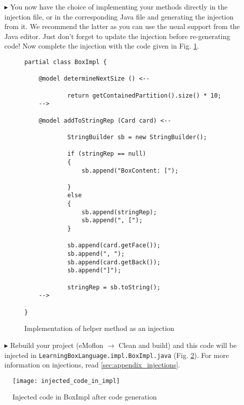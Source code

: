 \begin{enumerate}
	\clearpage
    \item[$\blacktriangleright$] You now have the choice of implementing your methods directly in the injection file, or in the corresponding Java file and
    generating the injection from it. We recommend the latter as you can use the usual support from the Java editor. Just don't forget to update the injection
    before re-generating code! Now complete the injection with the code given in Fig. \ref{code:complete_inject_file}.

    \begin{figure}[htbp]
        \centering
        \begin{lstlisting}[language=Injection]
partial class BoxImpl {

    @model determineNextSize () <--

            return getContainedPartition().size() * 10;
    -->

    @model addToStringRep (Card card) <--

            StringBuilder sb = new StringBuilder();

            if (stringRep == null)
            {
                sb.append("BoxContent: [");

            }
            else
            {
                sb.append(stringRep);
                sb.append(", [");
            }

            sb.append(card.getFace());
            sb.append(", ");
            sb.append(card.getBack());
            sb.append("]");

            stringRep = sb.toString();
    -->

}
        \end{lstlisting}
        \caption{Implementation of helper method as an injection}
        \label{code:complete_inject_file}
    \end{figure}
    \FloatBarrier
    \item[$\blacktriangleright$] Rebuild your project (eMoflon $\rightarrow$ Clean and build) and this code will be injected in
    \texttt{LearningBoxLanguage.impl.BoxImpl.java} (Fig. \ref{fig:injected_code_in_boxImpl}). For more information on injections, read
    \ref{sec:appendix_injections}.

\end{enumerate}



    \begin{figure}[htbp]
        \centering
        \texttt{[image: injected\_code\_in\_impl]}
        \caption{Injected code in BoxImpl after code generation}
        \label{fig:injected_code_in_boxImpl}
    \end{figure}
    
